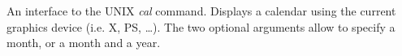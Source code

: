 An interface to the UNIX {\em cal} command. 
Displays a calendar using the current graphics device (i.e. X, PS, \ldots).
The two optional arguments allow to specify a month, or a month and a year.
